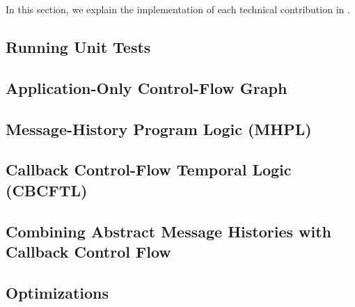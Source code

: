 \documentclass{acmart} %
\newcommand{\inputsection}[1]{\ifthenelse{\boolean{#1}}{}{\TODO{====== temp exclusion section #1 for build =======}}}
\begin{document}
In this section, we explain the implementation of each technical contribution in \toolname.

\subsection{Running Unit Tests}



\subsection{Application-Only Control-Flow Graph}

\TODO{}

\subsection{Message-History Program Logic (MHPL)}

\TODO{}

\subsection{Callback Control-Flow Temporal Logic (CBCFTL)}

\TODO{}

\subsection{Combining Abstract Message Histories with Callback Control Flow}

\TODO{}

\subsection{Optimizations}

\TODO{}

\fi



\end{document}
